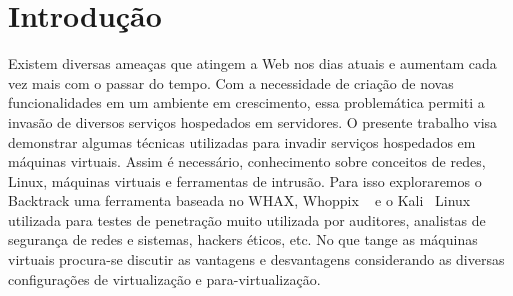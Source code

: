 
\chapter{Introdução}
Existem diversas ameaças que atingem a Web nos dias atuais e aumentam cada vez mais com o passar do tempo. Com a necessidade de criação de novas funcionalidades em um ambiente em crescimento, essa problemática permiti a invasão de diversos serviços hospedados em servidores. O presente trabalho visa demonstrar algumas técnicas utilizadas para invadir serviços hospedados em máquinas virtuais\cite{laureano}. Assim é necessário, conhecimento sobre conceitos de redes, Linux, máquinas virtuais e ferramentas de intrusão. Para isso exploraremos o Backtrack uma ferramenta baseada no WHAX, Whoppix ~\cite{giavaroto} e o Kali~\cite{broad} Linux utilizada para testes de penetração muito utilizada por auditores, analistas de segurança de redes e sistemas, hackers éticos, etc.
No que tange as máquinas virtuais procura-se discutir as vantagens e desvantagens considerando as diversas configurações de virtualização e para-virtualização.